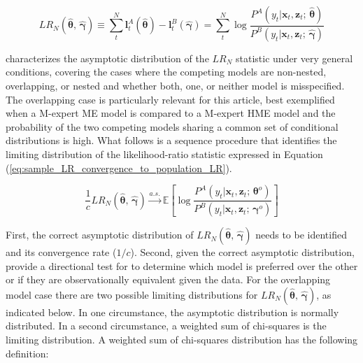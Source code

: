 \documentclass[12pt]{article}
\theoremstyle{definition}
\begin{document}
\begin{equation} \label{eq:LR_statistic}
  LR_{N} (\hat{\boldsymbol{\theta}}, \, \hat{\boldsymbol{\gamma}}) \equiv  \sum_{t}^{N} \boldsymbol{l}^{A}_{t}(\hat{\boldsymbol{\theta}}) - \boldsymbol{l}^{B}_{t}(\hat{\boldsymbol{\gamma}}) = \sum_{t}^{N} \log \frac{ P^{A}(y_{t} | \boldsymbol{x}_{t}, \boldsymbol{z}_{t}; \, \hat{\boldsymbol{\theta}}) }{ P^{B}(y_{t} | \boldsymbol{x}_{t}, \boldsymbol{z}_{t}; \, \hat{\boldsymbol{\gamma}}) }
\end{equation}

\citet{Voung1989} characterizes the asymptotic distribution of the $LR_{N}$ statistic under very general conditions, covering the cases where the competing models are non-nested, overlapping, or nested and whether both, one, or neither model is misspecified. The overlapping case is particularly relevant for this article, best exemplified when a M-expert ME model is compared to a M-expert HME model and the probability of the two competing models sharing a common set of conditional distributions is high. What follows is a sequence procedure that identifies the limiting distribution of the likelihood-ratio statistic expressed in Equation (\ref{eq:sample_LR_convergence_to_population_LR}).

\begin{equation} \label{eq:sample_LR_convergence_to_population_LR}
  \frac{1}{c} LR_{N}(\hat{\boldsymbol{\theta}}, \, \hat{\boldsymbol{\gamma}}) \overset{a.s.}{\longrightarrow} \mathbb{E} \left[ \log \frac{P^{A}(y_{t} | \boldsymbol{x}_{t}, \boldsymbol{z}_{t}; \, \boldsymbol{\theta}^{o})}{P^{B}(y_{t} | \boldsymbol{x}_{t}, \boldsymbol{z}_{t}; \, \boldsymbol{\gamma}^{o})} \right]
\end{equation}

First, the correct asymptotic distribution of $LR_{N}(\hat{\boldsymbol{\theta}}, \, \hat{\boldsymbol{\gamma}})$ needs to be identified and its convergence rate ($1/c$). Second, given the correct asymptotic distribution, provide a directional test for to determine which model is preferred over the other or if they are observationally equivalent given the data. For the overlapping model case there are two possible limiting distributions for $LR_{N}(\hat{\boldsymbol{\theta}}, \, \hat{\boldsymbol{\gamma}})$, as indicated below. In one circumstance, the asymptotic distribution is normally distributed. In a second circumstance, a weighted sum of chi-squares is the limiting distribution. A weighted sum of chi-squares distribution has the following definition:
\end{document}
